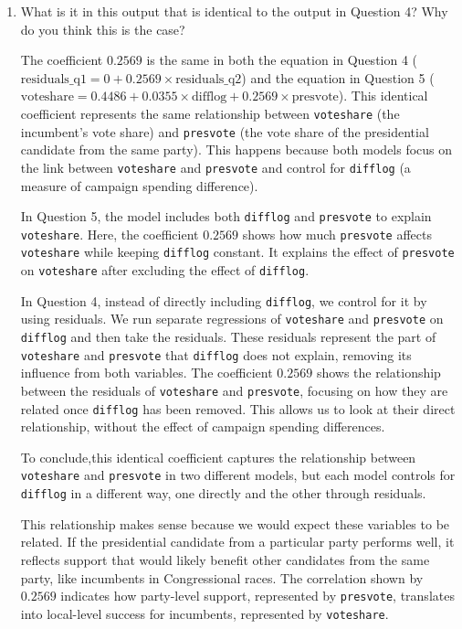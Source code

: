 \documentclass[12pt,letterpaper]{article}
\begin{document}
\begin{enumerate}
		
		\vspace{0.5cm}
		\item What is it in this output that is identical to the output in Question 4? Why do you think this is the case?
		
		The coefficient \( 0.2569 \) is the same in both the equation in Question 4 (\( \text{residuals\_q1} = 0 + 0.2569 \times \text{residuals\_q2} \)) and the equation in Question 5 (\( \text{voteshare} = 0.4486 + 0.0355 \times \text{difflog} + 0.2569 \times \text{presvote} \)). This identical coefficient represents the same relationship between \texttt{voteshare} (the incumbent’s vote share) and \texttt{presvote} (the vote share of the presidential candidate from the same party). This happens because both models focus on the link between \texttt{voteshare} and \texttt{presvote} and control for \texttt{difflog}  (a measure of campaign spending difference). 
		
		In Question 5, the model includes both \texttt{difflog} and \texttt{presvote} to explain \texttt{voteshare}. Here, the coefficient \(0.2569\) shows how much \texttt{presvote} affects \texttt{voteshare} while keeping \texttt{difflog} constant. It explains the effect of \texttt{presvote} on \texttt{voteshare} after excluding the effect of \texttt{difflog}. 

		
		In Question 4, instead of directly including \texttt{difflog}, we control for it by using residuals. We run separate regressions of \texttt{voteshare} and \texttt{presvote} on \texttt{difflog} and then take the residuals. These residuals represent the part of \texttt{voteshare} and \texttt{presvote} that \texttt{difflog} does not explain, removing its influence from both variables. The coefficient \(0.2569\)  shows the relationship between the residuals of \texttt{voteshare} and \texttt{presvote}, focusing on how they are related once \texttt{difflog} has been removed. This allows us to look at their direct relationship, without the effect of campaign spending differences.
		
		To conclude,this identical coefficient captures the relationship between \texttt{voteshare} and \texttt{presvote} in two different models, but each model controls for \texttt{difflog} in a different way, one directly and the other through residuals. 
		
		This relationship makes sense because we would expect these variables to be related. If the presidential candidate from a particular party performs well, it reflects support that would likely benefit other candidates from the same party, like incumbents in Congressional races. The correlation shown by \(0.2569\) indicates how party-level support, represented by \texttt{presvote}, translates into local-level success for incumbents, represented by \texttt{voteshare}.






		
		
		
	\end{enumerate}
\end{document}

